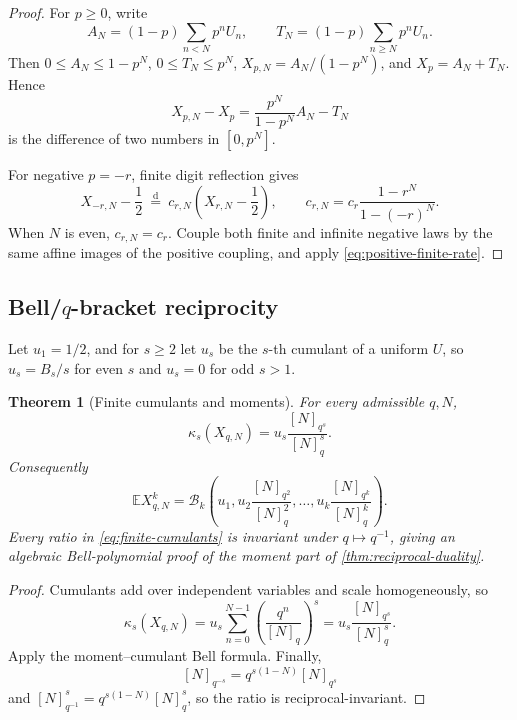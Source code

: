 \documentclass[11pt]{article}
\newtheorem{theorem}{Theorem}[section]
\theoremstyle{definition}
\newcommand{\E}{\mathbb E}
\newcommand{\cump}{\kappa}
\newcommand{\doteqL}{\mathrel{\stackrel{\mathrm d}=}}
\begin{document}
\begin{proof}
For \(p\ge0\), write
\[
 A_N=(1-p)\sum_{n<N}p^nU_n,\qquad
 T_N=(1-p)\sum_{n\ge N}p^nU_n.
\]
Then \(0\le A_N\le1-p^N\), \(0\le T_N\le p^N\),
\(X_{p,N}=A_N/(1-p^N)\), and \(X_p=A_N+T_N\).  Hence
\[
 X_{p,N}-X_p=\frac{p^N}{1-p^N}A_N-T_N
\]
is the difference of two numbers in \([0,p^N]\).

For negative \(p=-r\), finite digit reflection gives
\[
 X_{-r,N}-\frac12\ \doteqL\
 c_{r,N}\left(X_{r,N}-\frac12\right),
 \qquad
 c_{r,N}=c_r\frac{1-r^N}{1-(-r)^N}.
\]
When \(N\) is even, \(c_{r,N}=c_r\).  Couple both finite and infinite negative laws by
the same affine images of the positive coupling, and apply
\cref{eq:positive-finite-rate}.
\end{proof}

\subsection{Bell/$q$-bracket reciprocity}

Let \(u_1=1/2\), and for \(s\ge2\) let \(u_s\) be the $s$-th cumulant of a uniform
\(U\), so \(u_s=B_s/s\) for even \(s\) and \(u_s=0\) for odd \(s>1\).

\begin{theorem}[Finite cumulants and moments]\label{thm:finite-cumulants}
For every admissible \(q,N\),
\begin{equation}
 \boxed{
 \cump_s(X_{q,N})=u_s\frac{[N]_{q^s}}{[N]_q^s}.}          \label{eq:finite-cumulants}
\end{equation}
Consequently
\begin{equation}
 \E X_{q,N}^k=
 \mathcal B_k\!\left(
 u_1,
 u_2\frac{[N]_{q^2}}{[N]_q^2},\ldots,
 u_k\frac{[N]_{q^k}}{[N]_q^k}
 \right).                                                  \label{eq:finite-bell-moment}
\end{equation}
Every ratio in \cref{eq:finite-cumulants} is invariant under
\(q\mapsto q^{-1}\), giving an algebraic Bell-polynomial proof of the moment part of
\cref{thm:reciprocal-duality}.
\end{theorem}

\begin{proof}
Cumulants add over independent variables and scale homogeneously, so
\[
 \cump_s(X_{q,N})=u_s\sum_{n=0}^{N-1}
 \left(\frac{q^n}{[N]_q}\right)^s
 =u_s\frac{[N]_{q^s}}{[N]_q^s}.
\]
Apply the moment--cumulant Bell formula.  Finally,
\[
 [N]_{q^{-s}}=q^{s(1-N)}[N]_{q^s}
\]
and \([N]_{q^{-1}}^s=q^{s(1-N)}[N]_q^s\), so the ratio is reciprocal-invariant.
\end{proof}
\end{document}
